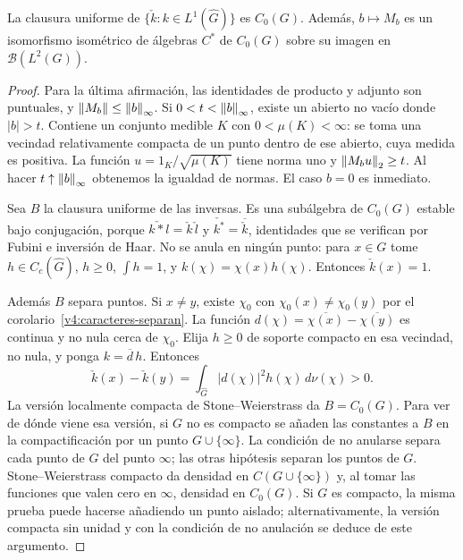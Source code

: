 \begin{lema}\label{v4:algebra-inversas-densa}
La clausura uniforme de $\{\check k:k\in L^1(\widehat G)\}$ es $C_0(G)$. Además, $b\mapsto M_b$ es un isomorfismo isométrico de álgebras $C^*$ de $C_0(G)$ sobre su imagen en $\mathcal B(L^2(G))$.
\end{lema}
\begin{proof}
Para la última afirmación, las identidades de producto y adjunto son puntuales, y $\left\lVert M_b\right\rVert\le\left\lVert b\right\rVert_\infty$. Si $0<t<\left\lVert b\right\rVert_\infty$, existe un abierto no vacío donde $|b|>t$. Contiene un conjunto medible $K$ con $0<\mu(K)<\infty$: se toma una vecindad relativamente compacta de un punto dentro de ese abierto, cuya medida es positiva. La función $u=1_K/\sqrt{\mu(K)}$ tiene norma uno y $\left\lVert M_bu\right\rVert_2\ge t$. Al hacer $t\uparrow\left\lVert b\right\rVert_\infty$ obtenemos la igualdad de normas. El caso $b=0$ es inmediato.

Sea $B$ la clausura uniforme de las inversas. Es una subálgebra de $C_0(G)$ estable bajo conjugación, porque
$\check{k*l}=\check k\,\check l$ y $\check{k^*}=\overline{\check k}$, identidades que se verifican por Fubini e inversión de Haar. No se anula en ningún punto: para $x\in G$ tome $h\in C_c(\widehat G)$, $h\ge0$, $\int h=1$, y $k(\chi)=\chi(x)h(\chi)$. Entonces $\check k(x)=1$.

Además $B$ separa puntos. Si $x\ne y$, existe $\chi_0$ con $\chi_0(x)\ne\chi_0(y)$ por el corolario~\ref{v4:caracteres-separan}. La función $d(\chi)=\overline{\chi(x)}-\overline{\chi(y)}$ es continua y no nula cerca de $\chi_0$. Elija $h\ge0$ de soporte compacto en esa vecindad, no nula, y ponga $k=\overline d\,h$. Entonces
\[
 \check k(x)-\check k(y)=\int_{\widehat G}|d(\chi)|^2h(\chi)\,d\nu(\chi)>0.
\]
La versión localmente compacta de Stone--Weierstrass da $B=C_0(G)$. Para ver de dónde viene esa versión, si $G$ no es compacto se añaden las constantes a $B$ en la compactificación por un punto $G\cup\{\infty\}$. La condición de no anularse separa cada punto de $G$ del punto $\infty$; las otras hipótesis separan los puntos de $G$. Stone--Weierstrass compacto da densidad en $C(G\cup\{\infty\})$ y, al tomar las funciones que valen cero en $\infty$, densidad en $C_0(G)$. Si $G$ es compacto, la misma prueba puede hacerse añadiendo un punto aislado; alternativamente, la versión compacta sin unidad y con la condición de no anulación se deduce de este argumento.
\end{proof}

